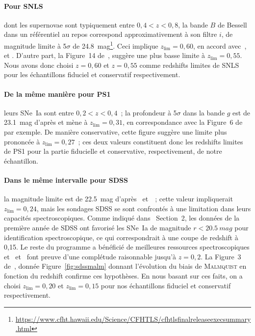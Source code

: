 \documentclass[../main/main.tex]{subfiles}
\begin{document}
\paragraph*{Pour SNLS} dont les supernovae sont typiquement entre $0,4 < z <
0,8$, la bande $B$ de Bessell dans un référentiel au repos correspond
approximativement à son filtre $i$, de magnitude limite à 5$\sigma$ de
\SI{24,8}{mag}\footnote{\href{
    https://www.cfht.hawaii.edu/Science/CFHTLS/cfhtlsfinalreleaseexecsummary.html}
{https://www.cfht.hawaii.edu/Science/CFHTLS/cfhtlsfinalreleaseexecsummary.html}}.
Ceci implique $z_{\lim} = 0,60$, en accord avec~\cite{neill2006, perrett2010},
et \citep[Section~2,2]{conley2011}. D'autre part, la Figure~14
de~\cite{perrett2010}, suggère une plus basse limite à $z_{\lim} = 0,55$. Nous
avons donc choisi $z=0,60$ et $z=0,55$ comme redshifts limites de SNLS pour les
échantillons fiduciel et conservatif respectivement.

\paragraph*{De la même manière pour PS1} leurs SNe~Ia sont entre $0,2 < z <
0,4$~; la profondeur à 5$\sigma$ dans la bande $g$ est de \SI{23,1}{mag} d'après
\cite{rest2014} et mène à $z_{\lim}=0,31$, en correspondance avec la Figure~6
de~\cite{scolnic2018} par exemple. De manière conservative, cette figure
suggère une limite plus prononcée à $z_{\lim}=0,27$~; ces deux valeurs
constituent donc les redshifts limites de PS1 pour la partie fiducielle et
conservative, respectivement, de notre échantillon.

\paragraph*{Dans le même intervalle pour SDSS} la magnitude limite est de
\SI{22,5}{mag} d'après~\cite{dilday2008} et~\cite{sako2008}~; cette valeur 
impliquerait $z_{\lim}=0,24$, mais les sondages SDSS se sont confrontés à une
limitation dans leurs capacités spectroscopiques. Comme indiqué
dans~\cite{kessler2009a} Section~2, les données de la première année de SDSS ont
favorisé les SNe~Ia de magnitude $r < \SI{20,5}{mag}$ pour identification
spectroscopique, ce qui correspondrait à une coupe de redshift à 0,15. Le reste
du programme a bénéficié de meilleures ressources spectroscopiques
et~\cite{kessler2009a} et~\cite{dilday2008} font preuve d'une complétude
raisonnable jusqu'à $z=0,2$. La Figure~3 de~\cite{conley2011}, donnée
Figure~\ref{fig:sdssmalm} donnant l'évolution du biais de \textsc{Malmquist} en
fonction du redshift confirme ces hypothèses. En nous basant sur ces faits, on a
choisi $z_{\lim}=0,20$ et $z_{\lim}=0,15$ pour nos échantillons fiduciel et
conservatif respectivement.
\end{document}
